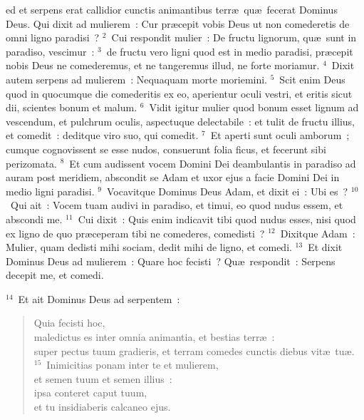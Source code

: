 \bchapter
{}ed et serpens erat callidior cunctis animantibus terr\ae\ qu\ae\ fecerat Dominus Deus. Qui dixit ad mulierem~: Cur pr\ae cepit vobis Deus ut non comederetis de omni ligno paradisi~?
${}^{2}$~Cui respondit mulier~: De fructu lignorum, qu\ae\ sunt in paradiso, vescimur~:
${}^{3}$~de fructu vero ligni quod est in medio paradisi, pr\ae cepit nobis Deus ne comederemus, et ne tangeremus illud, ne forte moriamur.
${}^{4}$~Dixit autem serpens ad mulierem~: Nequaquam morte moriemini.
${}^{5}$~Scit enim Deus quod in quocumque die comederitis ex eo, aperientur oculi vestri, et eritis sicut dii, scientes bonum et malum.
${}^{6}$~Vidit igitur mulier quod bonum esset lignum ad vescendum, et pulchrum oculis, aspectuque delectabile~: et tulit de fructu illius, et comedit~: deditque viro suo, qui comedit.
${}^{7}$~Et aperti sunt oculi amborum~; cumque cognovissent se esse nudos, consuerunt folia ficus, et fecerunt sibi perizomata.
${}^{8}$~Et cum audissent vocem Domini Dei deambulantis in paradiso ad auram post meridiem, abscondit se Adam et uxor ejus a facie Domini Dei in medio ligni paradisi.
${}^{9}$~Vocavitque Dominus Deus Adam, et dixit ei~: Ubi es~?
${}^{10}$~Qui ait~: Vocem tuam audivi in paradiso, et timui, eo quod nudus essem, et abscondi me.
${}^{11}$~Cui dixit~: Quis enim indicavit tibi quod nudus esses, nisi quod ex ligno de quo pr\ae ceperam tibi ne comederes, comedisti~?
${}^{12}$~Dixitque Adam~: Mulier, quam dedisti mihi sociam, dedit mihi de ligno, et comedi.
${}^{13}$~Et dixit Dominus Deus ad mulierem~: Quare hoc fecisti~? Qu\ae\ respondit~: Serpens decepit me, et comedi.


${}^{14}$~Et ait Dominus Deus ad serpentem~: \begin{flushleft}\begin{verse}Quia fecisti hoc,\\ maledictus es inter omnia animantia, et bestias terr\ae~:\\ super pectus tuum gradieris, et terram comedes cunctis diebus vit\ae\ tu\ae .\\
${}^{15}$~Inimicitias ponam inter te et mulierem,\\ et semen tuum et semen illius~:\\ ipsa conteret caput tuum,\\ et tu insidiaberis calcaneo ejus.\end{verse}\end{flushleft}


